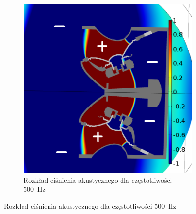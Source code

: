 \documentclass[12pt]{oska}
\begin{document}
\begin{figure}[!ht]
\begin{subfigure}[b]{.49\textwidth}
			\includegraphics[width=\textwidth]{pres_sig_500Hz_02.png}
			\caption{Rozkład ciśnienia akustycznego dla częstotliwości \SI{500}{\hertz}}
			\label{r:C_500}
		\end{subfigure}
		

\end{figure}
\end{document}
